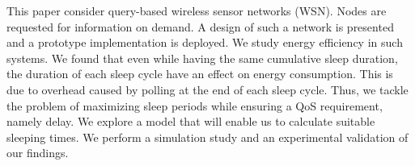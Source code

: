 This paper consider query-based wireless sensor networks (WSN). Nodes are requested for information on demand. A design of such a network is presented and a prototype implementation is deployed. We study energy efficiency in such systems. We found that even while having the same cumulative sleep duration, the duration of each sleep cycle have an effect on energy consumption. This is due to overhead caused by polling at the end of each sleep cycle. Thus, we tackle the problem of maximizing sleep periods while ensuring a QoS requirement, namely delay. We explore a model that will enable us to calculate suitable sleeping times. We perform a simulation study and an experimental validation of our findings.
